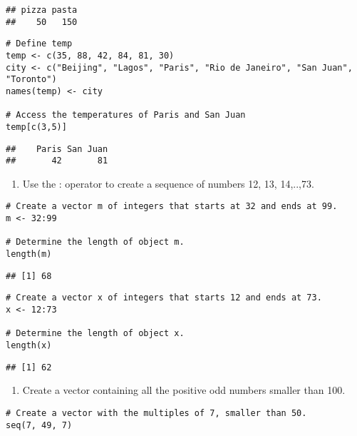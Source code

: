 \documentclass[
]{article}
\providecommand{\tightlist}{%
  \setlength{\itemsep}{0pt}\setlength{\parskip}{0pt}}
\begin{document}
\begin{verbatim}
## pizza pasta 
##    50   150
\end{verbatim}

\begin{verbatim}
# Define temp
temp <- c(35, 88, 42, 84, 81, 30)
city <- c("Beijing", "Lagos", "Paris", "Rio de Janeiro", "San Juan", "Toronto")
names(temp) <- city

# Access the temperatures of Paris and San Juan
temp[c(3,5)]
\end{verbatim}

\begin{verbatim}
##    Paris San Juan 
##       42       81
\end{verbatim}

\begin{enumerate}
\def\labelenumi{\arabic{enumi}.}
\setcounter{enumi}{5}
\tightlist
\item
  Use the : operator to create a sequence of numbers 12, 13, 14,..,73.
\end{enumerate}

\begin{verbatim}
# Create a vector m of integers that starts at 32 and ends at 99.
m <- 32:99

# Determine the length of object m.
length(m)
\end{verbatim}

\begin{verbatim}
## [1] 68
\end{verbatim}

\begin{verbatim}
# Create a vector x of integers that starts 12 and ends at 73.
x <- 12:73

# Determine the length of object x.
length(x)
\end{verbatim}

\begin{verbatim}
## [1] 62
\end{verbatim}

\begin{enumerate}
\def\labelenumi{\arabic{enumi}.}
\setcounter{enumi}{6}
\tightlist
\item
  Create a vector containing all the positive odd numbers smaller than
  100.
\end{enumerate}

\begin{verbatim}
# Create a vector with the multiples of 7, smaller than 50.
seq(7, 49, 7) 
\end{verbatim}
\end{document}
